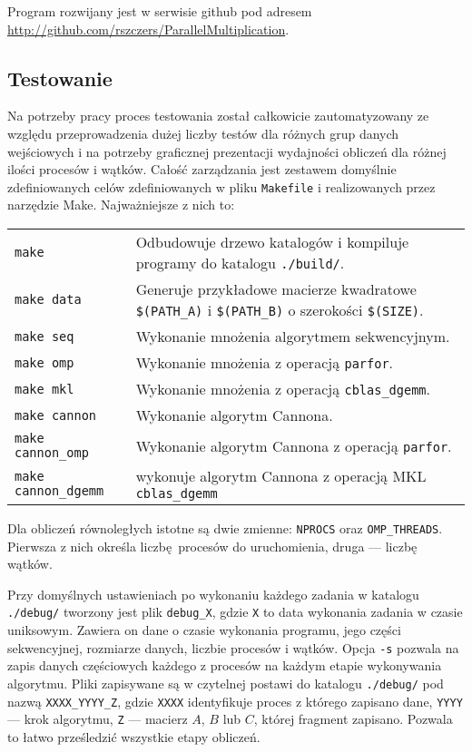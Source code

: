 Program rozwijany jest w serwisie github pod adresem \url{http://github.com/rszczers/ParallelMultiplication}.


\subsection{Testowanie}
Na potrzeby pracy proces testowania został całkowicie zautomatyzowany ze względu przeprowadzenia dużej liczby testów dla różnych grup danych wejściowych i na potrzeby graficznej prezentacji wydajności obliczeń dla różnej ilości procesów i wątków. Całość zarządzania jest zestawem domyślnie zdefiniowanych celów zdefiniowanych w pliku \texttt{Makefile} i realizowanych przez narzędzie Make. Najważniejsze z nich to:
\vspace{5mm}


\noindent\begin{tabular}{L{4cm}L{9cm}}
\texttt{make} & Odbudowuje drzewo katalogów i kompiluje programy do katalogu \texttt{./build/}. \\
\texttt{make data} & Generuje przykładowe macierze kwadratowe \texttt{\$(PATH\_A)} i \texttt{\$(PATH\_B)} o szerokości \texttt{\$(SIZE)}. \\
\texttt{make seq} & Wykonanie mnożenia algorytmem sekwencyjnym. \\
\texttt{make omp} & Wykonanie mnożenia z operacją \texttt{parfor}. \\
\texttt{make mkl} & Wykonanie mnożenia z operacją \texttt{cblas\_dgemm}. \\
\texttt{make cannon} & Wykonanie algorytm Cannona.\\
\texttt{make cannon\_omp} & Wykonanie algorytm Cannona z operacją \texttt{parfor}.\\ 
\texttt{make cannon\_dgemm} & wykonuje algorytm Cannona z operacją MKL \texttt{cblas\_dgemm}
\end{tabular}


\vspace{5mm}
Dla obliczeń równoległych istotne są dwie zmienne: \texttt{NPROCS} oraz \texttt{OMP\_THR\-EADS}. Pierwsza z nich określa liczbę procesów do uruchomienia, druga --- liczbę wątków.


Przy domyślnych ustawieniach po wykonaniu każdego zadania w katalogu \texttt{./debug/} tworzony jest plik \texttt{debug\_X}, gdzie \texttt{X} to data wykonania zadania w czasie uniksowym. Zawiera on dane o czasie wykonania programu, jego części sekwencyjnej, rozmiarze danych, liczbie procesów i wątków. Opcja \texttt{-s} pozwala na zapis danych częściowych każdego z procesów na każdym etapie wykonywania algorytmu. Pliki zapisywane są w czytelnej postawi do katalogu \texttt{./debug/} pod nazwą \texttt{XXXX\_YYYY\_Z}, gdzie \texttt{XXXX} identyfikuje proces z którego zapisano dane, \texttt{YYYY} --- krok algorytmu, \texttt{Z} --- macierz \(A\), \(B\) lub \(C\), której fragment zapisano. Pozwala to łatwo prześledzić wszystkie etapy obliczeń.

